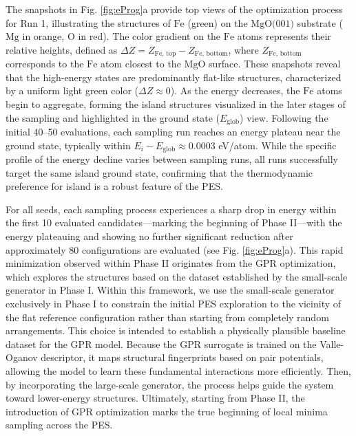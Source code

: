 The snapshots in Fig. \ref{fig:eProg}a provide top views of the optimization process for Run 1, illustrating the structures of $\text{Fe}$ (green) on the $\text{MgO(001)}$ substrate ($\text{Mg}$ in orange, $\text{O}$ in red). The color gradient on the $\text{Fe}$ atoms represents their relative heights, defined as $\Delta Z = Z_{\text{Fe, top}} - Z_{\text{Fe, bottom}}$, where $Z_{\text{Fe, bottom}}$ corresponds to the $\text{Fe}$ atom closest to the $\text{MgO}$ surface. These snapshots reveal that the high-energy states are predominantly flat-like structures, characterized by a uniform light green color ($\Delta Z \approx 0$). As the energy decreases, the $\text{Fe}$ atoms begin to aggregate, forming the island structures visualized in the later stages of the sampling and highlighted in the ground state ($E_{\mathrm{glob}}$) view. Following the initial 40–50 evaluations, each sampling run reaches an energy plateau near the ground state, typically within $E_i - E_{\text{glob}} \approx 0.0003$ eV/atom. While the specific profile of the energy decline varies between sampling runs, all runs successfully target the same island ground state, confirming that the thermodynamic preference for island is a robust feature of the PES.

For all seeds, each sampling process experiences a sharp drop in energy within the first 10 evaluated candidates—marking the beginning of Phase II—with the energy plateauing and showing no further significant reduction after approximately 80 configurations are evaluated (see Fig. \ref{fig:eProg}a). This rapid minimization observed within Phase II originates from the GPR optimization, which explores the structures based on the dataset established by the small-scale generator in Phase I. Within this framework, we use the small-scale generator exclusively in Phase I to constrain the initial PES exploration to the vicinity of the flat reference configuration rather than starting from completely random arrangements. This choice is intended to establish a physically plausible baseline dataset for the GPR model. Because the GPR surrogate is trained on the Valle-Oganov descriptor, it maps structural fingerprints based on pair potentials, allowing the model to learn these fundamental interactions more efficiently. Then, by incorporating the large-scale generator, the process helps guide the system toward lower-energy structures. Ultimately, starting from Phase II, the introduction of GPR optimization marks the true beginning of local minima sampling across the PES.

